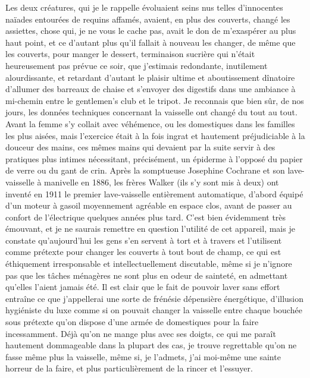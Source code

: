 Les deux créatures, qui je le rappelle évoluaient seins nus telles d’innocentes naïades entourées de requins affamés, avaient, en plus des couverts, changé les assiettes, chose qui, je ne vous le cache pas, avait le don de m’exaspérer au plus haut point, et ce d’autant plus qu’il fallait à nouveau les changer, de même que les couverts, pour manger le dessert, terminaison sucrière qui n’était heureusement pas prévue ce soir, que j’estimais redondante, inutilement alourdissante, et retardant d’autant le plaisir ultime et aboutissement dînatoire d’allumer des barreaux de chaise et s’envoyer des digestifs dans une ambiance à mi-chemin entre le gentlemen’s club et le tripot. Je reconnais que bien sûr, de nos jours, les données techniques concernant la vaisselle ont changé du tout au tout. Avant la femme s’y collait avec véhémence, ou les domestiques dans les familles les plus aisées, mais l’exercice était à la fois ingrat et hautement préjudiciable à la douceur des mains, ces mêmes mains qui devaient par la suite servir à des pratiques plus intimes nécessitant, précisément, un épiderme à l’opposé du papier de verre ou du gant de crin. Après la somptueuse Josephine Cochrane%
\illusloflabel{}%
%
et son lave-vaisselle à manivelle en 1886, les frères Walker (ils s’y sont mis à deux) ont inventé en 1911 le premier lave-vaisselle entièrement automatique, d’abord équipé d’un moteur à gasoil moyennement agréable en espace clos, avant de passer au confort de l’électrique quelques années plus tard. C’est bien évidemment très émouvant, et je ne saurais remettre en question l’utilité de cet appareil, mais je constate qu’aujourd’hui les gens s’en servent à tort et à travers et l’utilisent comme prétexte pour changer les couverts à tout bout de champ, ce qui est éthiquement irresponsable et intellectuellement discutable, même si je n’ignore pas que les tâches ménagères ne sont plus en odeur de sainteté, en admettant qu’elles l’aient jamais été. Il est clair que le fait de pouvoir laver sans effort entraîne ce que j’appellerai une sorte de frénésie dépensière énergétique, d’illusion hygiéniste du luxe comme si on pouvait changer la vaisselle entre chaque bouchée sous prétexte qu’on dispose d’une armée de domestiques pour la faire incessamment. Déjà qu’on ne mange plus avec ses doigts, ce qui me paraît hautement dommageable dans la plupart des cas, je trouve regrettable qu’on ne fasse même plus la vaisselle, même si, je l’admets, j’ai moi-même une sainte horreur de la faire, et plus particulièrement de la rincer et l’essuyer.


